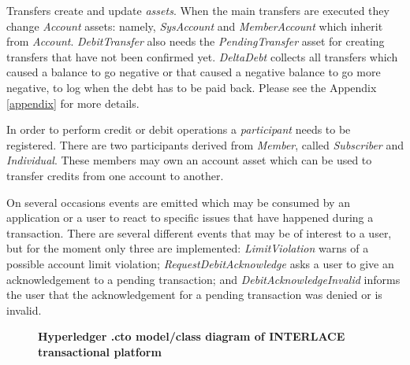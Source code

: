 Transfers create and update \textit{assets}. When the main transfers are executed they change \textit{Account} assets: namely, \textit{SysAccount} and \textit{MemberAccount} which inherit from \textit{Account}. \textit{DebitTransfer} also needs the \textit{PendingTransfer} asset for creating transfers that have not been confirmed yet. \textit{DeltaDebt} collects all transfers which caused a balance to go negative or that caused a negative balance to go more negative, to log when the debt has to be paid back. Please see the Appendix \ref{appendix} for more details.

In order to perform credit or debit operations a \textit{participant} needs to be registered. There are two participants derived from \textit{Member}, called \textit{Subscriber} and \textit{Individual}. These members may own an account asset which can be used to transfer credits from one account to another.

On several occasions events are emitted which may be consumed by an application or a user to react to specific issues that have happened during a transaction. There are several different events that may be of interest to a user, but for the moment only three are implemented: \textit{LimitViolation} warns of a possible account limit violation; \textit{RequestDebitAcknowledge} asks a user to give an acknowledgement to a pending transaction; and \textit{DebitAcknowledgeInvalid} informs the user that the acknowledgement for a pending transaction was denied or is invalid.


\begin{figure}[h]
\centering
{}
\caption{\bf \small Hyperledger .cto model/class diagram of INTERLACE transactional platform}
\label{fig:DCN-cto}
\end{figure}


